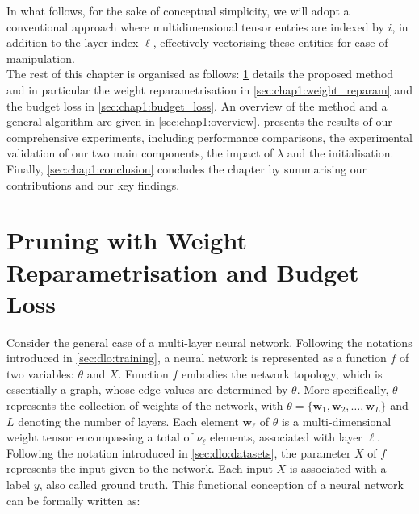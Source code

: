 In what follows, for the sake of conceptual simplicity, we will adopt a
conventional approach where multidimensional tensor entries are indexed by $i$,
in addition to the layer index $\ell$, effectively vectorising these entities
for ease of manipulation. \\

The rest of this chapter is organised as follows: \cref{sec:chap1:pruning}
details the proposed method and in particular the weight reparametrisation in
\cref{sec:chap1:weight_reparam} and the budget loss in
\cref{sec:chap1:budget_loss}. An overview of the method and a general algorithm
are given in \cref{sec:chap1:overview}.  presents
the results of our comprehensive experiments, including performance comparisons,
the experimental validation of our two main components, the impact of $\lambda$
and the initialisation. Finally, \cref{sec:chap1:conclusion} concludes the
chapter by summarising our contributions and our key findings.\\





\section{Pruning with Weight Reparametrisation and Budget Loss}\label{sec:chap1:pruning}
Consider the general case of a multi-layer neural network. Following the
notations introduced in \cref{sec:dlo:training}, a neural network is represented
as a function $f$ of two variables: $\theta$ and $X$. Function $f$ embodies the
network topology, which is essentially a graph, whose edge values are
determined by $\theta$. More specifically, $\theta$ represents the collection of
weights of the network, with $\theta = \{\mathbf{w}_1, \mathbf{w}_2, \ldots,
\mathbf{w}_L\}$ and $L$ denoting the number of layers. Each element
$\mathbf{w}_\ell$ of $\theta$ is a multi-dimensional weight tensor encompassing
a total of $\nu_\ell$ elements, associated with layer $\ell$. Following the
notation introduced in \cref{sec:dlo:datasets}, the parameter $X$ of $f$
represents the input given to the network. Each input $X$ is associated with a
label $y$, also called ground truth. This functional conception of a neural
network can be formally written as:\\


